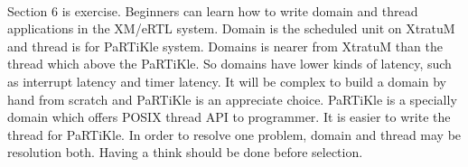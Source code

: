 \\
Section 6 is exercise. Beginners can learn how to write domain and thread applications in the XM/eRTL system. Domain is the scheduled unit on XtratuM and thread is for PaRTiKle system. Domains is nearer from XtratuM than the thread which above the PaRTiKle. So domains have lower kinds of latency, such as interrupt latency and timer latency. It will be complex to build a domain by hand from scratch and PaRTiKle is an appreciate choice. PaRTiKle is a specially domain which offers POSIX thread API to programmer. It is easier to write the thread for PaRTiKle. In order to resolve one problem, domain and thread may be resolution both. Having a think should be done before selection.        


